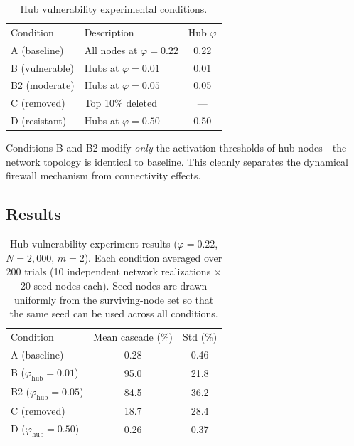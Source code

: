 \documentclass[aps,pre,twocolumn,superscriptaddress,showpacs]{revtex4-2}
\begin{document}
\begin{table}[h]
\caption{Hub vulnerability experimental conditions.}
\label{tab:conditions}
\begin{ruledtabular}
\begin{tabular}{llc}
\textrm{Condition} & \textrm{Description} & \multicolumn{1}{c}{\textrm{Hub } $\varphi$} \\
\colrule
A (baseline) & All nodes at $\varphi=0.22$ & 0.22 \\
B (vulnerable) & Hubs at $\varphi=0.01$ & 0.01 \\
B2 (moderate) & Hubs at $\varphi=0.05$ & 0.05 \\
C (removed) & Top 10\% deleted & \multicolumn{1}{c}{---} \\
D (resistant) & Hubs at $\varphi=0.50$ & 0.50 \\
\end{tabular}
\end{ruledtabular}
\end{table}

Conditions B and B2 modify \emph{only} the activation thresholds of hub nodes---the network topology is identical to baseline. This cleanly separates the dynamical firewall mechanism from connectivity effects.

\subsection{Results}

\begin{table}[h]
\caption{Hub vulnerability experiment results ($\varphi=0.22$, $N=2{,}000$, $m=2$). Each condition averaged over 200 trials (10 independent network realizations $\times$ 20 seed nodes each). Seed nodes are drawn uniformly from the surviving-node set so that the same seed can be used across all conditions.}
\label{tab:hub_vuln}
\begin{ruledtabular}
\begin{tabular}{lcc}
\textrm{Condition} & \textrm{Mean cascade (\%)} & \multicolumn{1}{c}{\textrm{Std (\%)}} \\
\colrule
A (baseline) & 0.28 & 0.46 \\
B ($\varphi_{\mathrm{hub}}=0.01$) & 95.0 & 21.8 \\
B2 ($\varphi_{\mathrm{hub}}=0.05$) & 84.5 & 36.2 \\
C (removed) & 18.7 & 28.4 \\
D ($\varphi_{\mathrm{hub}}=0.50$) & 0.26 & 0.37 \\
\end{tabular}
\end{ruledtabular}
\end{table}
\end{document}
